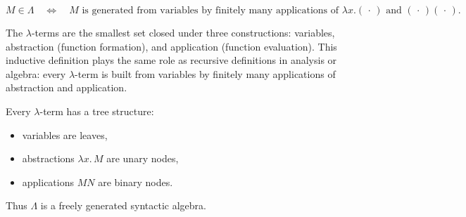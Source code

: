\begin{remark*}
\[
M \in \Lambda
\quad\Longleftrightarrow\quad
M \text{ is generated from variables by finitely many applications of }
\lambda x.(\,\cdot\,) \text{ and } (\,\cdot\,)(\,\cdot\,).
\]
\end{remark*}

\begin{remark*}[Interpretation]
The $\lambda$-terms are the smallest set closed under three constructions:
variables, abstraction (function formation), and application (function
evaluation). This inductive definition plays the same role as recursive
definitions in analysis or algebra: every $\lambda$-term is built from
variables by finitely many applications of abstraction and application.
\end{remark*}

\begin{remark*}[Exposition]
Every $\lambda$-term has a tree structure:
\begin{itemize}
    \item variables are leaves,
    \item abstractions $\lambda x.\,M$ are unary nodes,
    \item applications $MN$ are binary nodes.
\end{itemize}
Thus $\Lambda$ is a freely generated syntactic algebra.
\end{remark*}
